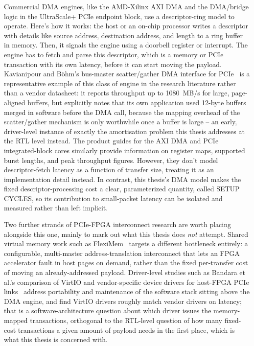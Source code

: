 Commercial DMA engines, like the AMD-Xilinx AXI DMA and the DMA/bridge logic in the UltraScale+ PCIe endpoint block, use a descriptor-ring model to operate. Here's how it works: the host or an on-chip processor writes a descriptor with details like source address, destination address, and length to a ring buffer in memory. Then, it signals the engine using a doorbell register or interrupt. The engine has to fetch and parse this descriptor, which is a memory or PCIe transaction with its own latency, before it can start moving the payload. Kavianipour and B{\"o}hm's bus-master scatter/gather DMA interface for PCIe~\cite{kavianipour2012high} is a representative example of this class of engine in the research literature rather than a vendor datasheet: it reports throughput up to 1080~MB/s for large, page-aligned buffers, but explicitly notes that its own application used 12-byte buffers merged in software before the DMA call, because the mapping overhead of the scatter/gather mechanism is only worthwhile once a buffer is large -- an early, driver-level instance of exactly the amortisation problem this thesis addresses at the RTL level instead. The product guides for the AXI DMA and PCIe integrated-block cores similarly provide information on register maps, supported burst lengths, and peak throughput figures. However, they don't model descriptor-fetch latency as a function of transfer size, treating it as an implementation detail instead. In contrast, this thesis's DMA model makes the fixed descriptor-processing cost a clear, parameterized quantity, called SETUP CYCLES, so its contribution to small-packet latency can be isolated and measured rather than left implicit.

Two further strands of PCIe-FPGA interconnect research are worth placing alongside this one, mainly to mark out what this thesis does \emph{not} attempt. Shared virtual memory work such as FlexiMem~\cite{sonmez2024fleximem} targets a different bottleneck entirely: a configurable, multi-master address-translation interconnect that lets an FPGA accelerator fault in host pages on demand, rather than the fixed per-transfer cost of moving an already-addressed payload. Driver-level studies such as Bandara et al.'s comparison of VirtIO and vendor-specific device drivers for host-FPGA PCIe links~\cite{bandara2024performance} address portability and maintenance of the software stack sitting above the DMA engine, and find VirtIO drivers roughly match vendor drivers on latency; that is a software-architecture question about which driver issues the memory-mapped transactions, orthogonal to the RTL-level question of how many fixed-cost transactions a given amount of payload needs in the first place, which is what this thesis is concerned with.

